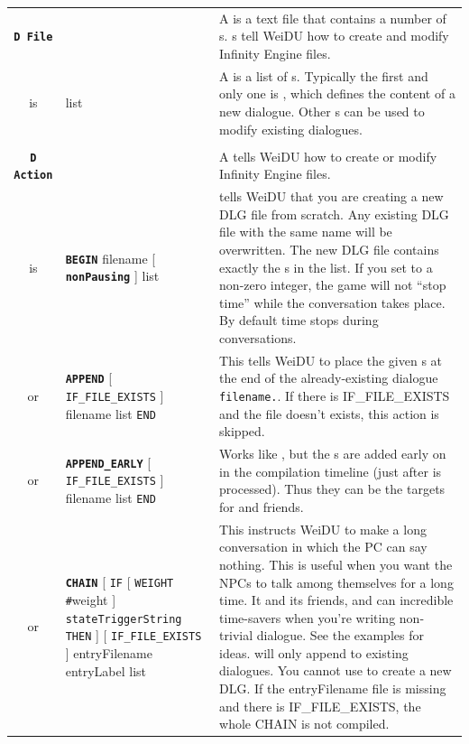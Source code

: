 \documentclass{article}
\def\ttref#1{\ahrefloc{#1}{\tt #1}}
\def\DEFINE#1{{\tt \bf #1}\label{#1}\index{#1}}
\def\t#1{{\tt #1}}
\def\Slist{{\color{red} list }}
\def\Ob{{\color{red} [ }}
\def\Oe{{\color{red} ] }}
\begin{document}
\begin{tabular}{cp{10in}|p{10in}}

\DEFINE{D File} & &
  A \ttref{D File} is a text file that contains a number of \ttref{D Action}s.
  \ttref{D File}s tell WeiDU how to create and modify Infinity
  Engine \ttref{DLG} files.  \\

  is & \ttref{D Action} \Slist &
  A \ttref{D File} is a list of \ttref{D Action}s. Typically the first and
  only one is \ttref{BEGIN}, which defines the content of a new dialogue.
  Other \ttref{D Action}s can be used to modify existing dialogues. \\

\\

\DEFINE{D Action} & &
  A \ttref{D Action} tells WeiDU how to create or modify Infinity Engine
  \ttref{DLG} files. \\

  is & \DEFINE{BEGIN} filename \Ob \DEFINE{nonPausing} \Oe \ttref{state} \Slist &
    \ttref{BEGIN} tells WeiDU that you are creating a new DLG file from
    scratch. Any existing DLG file with the same name will be overwritten.
    The new DLG file contains exactly the \ttref{state}s in the list.
    If you set \ttref{nonPausing} to a non-zero integer, the game will not
    ``stop time'' while the conversation takes place. By default time stops
    during conversations.  \\

  or   & \DEFINE{APPEND} \Ob \t{IF_FILE_EXISTS} \Oe filename \ttref{state} \Slist {\tt END} &
    This tells WeiDU to place the given \ttref{state}s at the end of the
    already-existing dialogue \t{filename.}\ttref{DLG}. If there is IF_FILE_EXISTS
    and the file doesn't exists, this action is skipped. \\

  or   & \DEFINE{APPEND_EARLY} \Ob \t{IF_FILE_EXISTS} \Oe filename \ttref{state} \Slist {\tt END} &
    Works like \ttref{APPEND}, but the \ttref{state}s are added early on in
    the compilation timeline (just after \ttref{BEGIN} is processed). Thus
    they can be the targets for \ttref{INTERJECT_COPY_TRANS} and friends.
    \\

  or & \DEFINE{CHAIN}
    \Ob {\tt IF} \Ob {\tt WEIGHT} {\tt \#}weight \Oe {\tt
    stateTriggerString}  {\tt THEN} \Oe \Ob \t{IF_FILE_EXISTS} \Oe
    entryFilename entryLabel \ttref{chainText} \Slist
    \ttref{chainEpilogue} &
  This instructs WeiDU to make a long conversation in which the PC can say
  nothing. This is useful when you want the NPCs to talk among themselves
  for a long time. It and its friends, \ttref{INTERJECT} and
  \ttref{INTERJECT_COPY_TRANS} can incredible time-savers when you're
  writing non-trivial dialogue. See the examples for ideas. \ttref{CHAIN}
  will only append to existing dialogues. You cannot use \ttref{CHAIN} to
  create a new DLG. If the entryFilename file is missing and there is IF_FILE_EXISTS,
  the whole CHAIN is not compiled.
  \\


\end{tabular}
\end{document}
